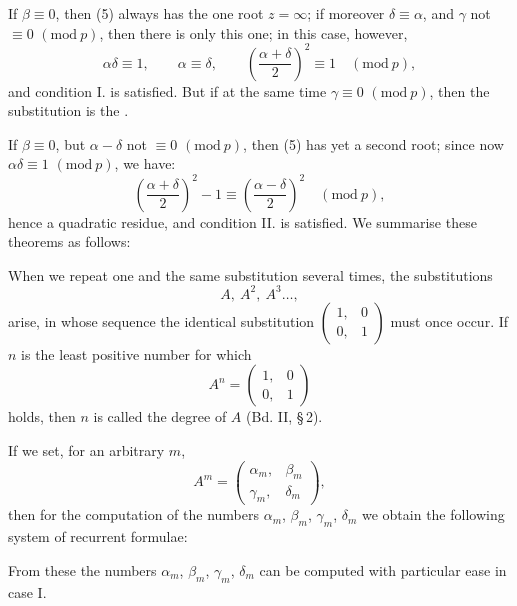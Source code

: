 If $\beta \equiv 0$, then (5) always has the one root $z = \infty$; if
moreover $\delta \equiv \alpha$, and $\gamma$ not $\equiv 0$ $(\mathrm{mod}\ p)$, then there is only this
one; in this case, however,
\[
\alpha\delta \equiv 1, \qquad \alpha \equiv \delta, \qquad \left(\frac{\alpha+\delta}{2}\right)^2 \equiv 1 \quad (\mathrm{mod}\ p),
\]
and condition I. is satisfied. But if at the same time $\gamma \equiv 0$ $(\mathrm{mod}\ p)$,
then the substitution is the .

If $\beta \equiv 0$, but $\alpha-\delta$ not $\equiv 0$ $(\mathrm{mod}\ p)$, then (5) has yet
a second root; since now $\alpha\delta \equiv 1$ $(\mathrm{mod}\ p)$, we have:
\[
\left(\frac{\alpha+\delta}{2}\right)^2 - 1 \equiv \left(\frac{\alpha-\delta}{2}\right)^2 \quad (\mathrm{mod}\ p),
\]
hence a quadratic residue, and condition II. is satisfied. We
summarise these theorems as follows:


When we repeat one and the same substitution
several times, the substitutions
\[
A, \ A^2, \ A^3 \dots,
\]
arise, in whose sequence the identical substitution $\begin{pmatrix}1, & 0 \\ 0, & 1\end{pmatrix}$
must once occur. If $n$ is the least positive number for which
\[
A^n = \begin{pmatrix}1, & 0 \\ 0, & 1\end{pmatrix}
\]
holds, then $n$ is called the degree of $A$ (Bd. II, \S\,2).

If we set, for an arbitrary $m$,
\[
A^m = \begin{pmatrix}\alpha_m, & \beta_m \\ \gamma_m, & \delta_m\end{pmatrix},
\]
then for the computation of the numbers $\alpha_m$, $\beta_m$, $\gamma_m$,
$\delta_m$ we obtain the following system of recurrent formulae:

From these the numbers $\alpha_m$, $\beta_m$,
$\gamma_m$, $\delta_m$ can be computed with particular ease in case I.

